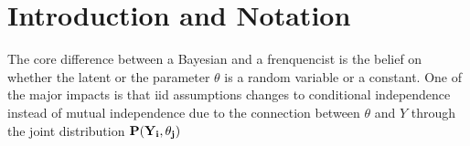\chapter{Introduction and Notation}

The core difference between a Bayesian and a frenquencist is the belief on whether the latent or the parameter $\theta$ is a random variable or a constant. One of the major impacts is that iid assumptions changes to conditional independence instead of mutual independence due to the connection between $\theta$ and $Y$ through the joint distribution $\bf{P}(Y_i, \theta_j)$